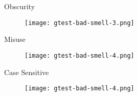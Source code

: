 \begin{frame}{Obscurity}
    \centering
    \begin{figure}
      \centering
      \texttt{[image: gtest-bad-smell-3.png]}
    \end{figure}
\end{frame}

\begin{frame}{Misuse}
    \centering
    \begin{figure}
      \centering
      \texttt{[image: gtest-bad-smell-4.png]}
    \end{figure}
\end{frame}

\begin{frame}{Case Sensitive}
    \centering
    \begin{figure}
      \centering
      \texttt{[image: gtest-bad-smell-4.png]}
    \end{figure}
\end{frame}
